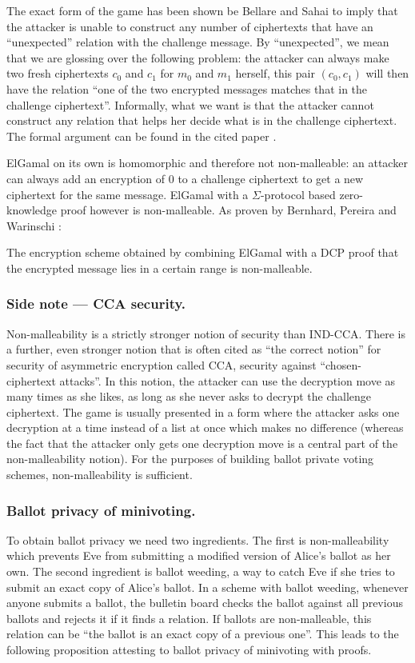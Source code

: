 \documentclass[envcountsame]{llncs}
\begin{document}
The exact form of the game has been shown be Bellare and Sahai \cite{BS99} to
imply that the attacker is unable to construct any number of ciphertexts that
have an ``unexpected'' relation with the challenge message. By ``unexpected'',
we mean that we are glossing over the following problem: the attacker can
always make two fresh ciphertexts $c_0$ and $c_1$ for $m_0$ and $m_1$ herself,
this pair $(c_0, c_1)$ will then have the relation ``one of the two encrypted
messages matches that in the challenge ciphertext''. Informally, what we want is
that the attacker cannot construct any relation that helps her decide what is in
the challenge ciphertext. The formal argument can be found in the cited paper
\cite{BS99}.

ElGamal on its own is homomorphic and therefore not non-malleable: an attacker
can always add an encryption of $0$ to a challenge ciphertext to get a new
ciphertext for the same message. ElGamal with a $\Sigma$-protocol based
zero-knowledge proof however is non-malleable. As proven by Bernhard, Pereira
and Warinschi \cite{BPW12b}:

\begin{proposition}
The encryption scheme obtained by combining ElGamal with a DCP proof that the
encrypted message lies in a certain range is non-malleable.
\end{proposition}

\subsubsection{Side note --- CCA security.}
Non-malleability is a strictly stronger notion of security than IND-CCA.
There is a further, even stronger notion that is often cited as ``the correct
notion'' for security of asymmetric encryption called CCA, security against
``chosen-ciphertext attacks''. In this notion, the attacker can use the
decryption move as many times as she likes, as long as she never asks to
decrypt the challenge ciphertext. The game is usually presented in a form where
the attacker asks one decryption at a time instead of a list at once which makes
no difference (whereas the fact that the attacker only gets one decryption move
is a central part of the non-malleability notion). For the purposes of building
ballot private voting schemes, non-malleability is sufficient.

\subsubsection{Ballot privacy of minivoting.}
To obtain ballot privacy we need two ingredients. The first is non-malleability
which prevents Eve from submitting a modified version of Alice's ballot as her
own. The second ingredient is ballot weeding, a way to catch Eve if she tries to
submit an exact copy of Alice's ballot. In a scheme with ballot weeding,
whenever anyone submits a ballot, the bulletin board checks the ballot against
all previous ballots and rejects it if it finds a relation. If ballots are
non-malleable, this relation can be ``the ballot is an exact copy of a previous
one''.
This leads to the following proposition attesting to ballot privacy of
minivoting with proofs.
\end{document}
